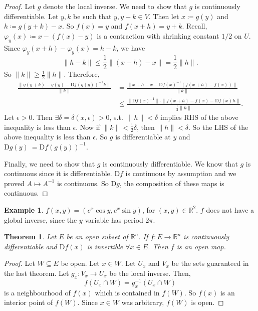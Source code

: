 \documentclass[12pt]{article}
\theoremstyle{plain}
\newtheorem{thm}{Theorem}
\theoremstyle{definition}
\newtheorem*{eg}{Example}
\begin{document}
\begin{proof}
    Let $g$ denote the local inverse.
    We need to show that $g$ is continuously differentiable.
    Let $y, k$ be such that $y, y+k\in V$.
    Then let $x\coloneqq g(y)$ and $h\coloneqq g(y+k)-x$.
    So $f(x) = y$ and $f(x+h) = y+k$.
    Recall, $\varphi_y(x) \coloneqq x-(f(x)-y)$ is a contraction with shrinking constant $1/2$ on $U$.
    Since
    $\varphi_y(x+h) - \varphi_y(x) = h-k$,
    we have
    \[
        \|h-k\| \leq \frac{1}{2}\|(x+h)-x\| = \frac{1}{2}\|h\|.
    \]
    So $\|k\| \geq\frac{1}{2}\|h\|$.
    Therefore,
    \[\begin{aligned}
        \frac{\|g(y+k) - g(y) - \mathrm{D}f(g(y))^{-1}k\|}{\|k\|}
        &=\frac{\|x+h-x - \mathrm{D}f(x)^{-1}(f(x+h)-f(x))\|}{\|k\|}\\
        &\leq \frac{\|\mathrm{D}f(x)^{-1}\|\cdot\|f(x+h)-f(x)-\mathrm{D}f(x)h\|}{\frac{1}{2}\|h\|}.
    \end{aligned}\]
    Let $\epsilon>0$.
    Then $\exists \delta=\delta(x,\epsilon)>0$, s.t.\ $\|h\|<\delta$ implies RHS of the above inequality is less than $\epsilon$.
    Now if $\|k\|<\frac{1}{2}\delta$, then $\|h\|<\delta$.
    So the LHS of the above inequality is less than $\epsilon$.
    So $g$ is differentiable at $y$ and $\mathrm{D}g(y)\ = \mathrm{D}f(g(y))^{-1}$.

    Finally, we need to show that $g$ is continuously differentiable.
    We know that $g$ is continuous since it is differentiable.
    $\mathrm{D}f$ is continuous by assumption and we proved $A\mapsto A^{-1}$ is continuous.
    So $\mathrm{D}g$, the composition of these maps is continuous.
\end{proof}
\begin{eg}
    $f(x,y) = (e^x \cos y, e^x \sin y)$, for $(x,y)\in\mathbb{R}^2$.
    $f$ does not have a global inverse, since the $y$ variable has period $2\pi$.
\end{eg}

\begin{thm}
    Let $E$ be an open subset of $\mathbb{R}^n$.
    If $f:E\rightarrow\mathbb{R}^n$ is continuously differentiable and $\mathrm{D}f(x)$ is invertible $\forall x\in E$.
    Then $f$ is an open map.
\end{thm}
\begin{proof}
    Let $W\subseteq E$ be open.
    Let $x\in W$.
    Let $U_x$ and $V_x$ be the sets guaranteed in the last theorem.
    Let $g_x:V_x\rightarrow U_x$ be the local inverse.
    Then,
    \[
        f(U_x\cap W) = g_x^{-1} (U_x\cap W)
    \]
    is a neighbourhood of $f(x)$ which is contained in $f(W)$.
    So $f(x)$ is an interior point of $f(W)$.
    Since $x\in W$ was arbitrary, $f(W)$ is open.
\end{proof}
\end{document}
